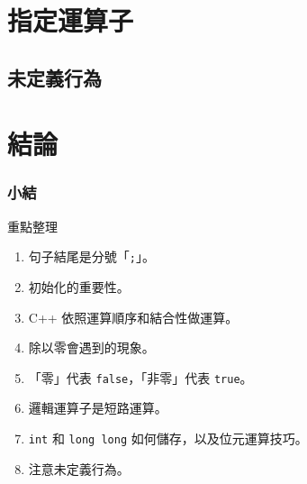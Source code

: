 \documentclass[utf8]{beamer}
\begin{document}
\begin{CJK}{UTF8}{bkai}
\section{指定運算子}

\subsection{未定義行為}

\section{結論}

\begin{frame}[fragile]
  \frametitle{小結}
  \begin{alertblock}{重點整理}
    \begin{enumerate}[<+->]
    \item 句子結尾是分號「\lstinline{;}」。
    \item 初始化的重要性。
    \item C++ 依照運算順序和結合性做運算。
    \item 除以零會遇到的現象。
    \item 「零」代表 \lstinline{false}，「非零」代表 \lstinline{true}。
    \item 邏輯運算子是短路運算。
    \item \lstinline{int} 和 \lstinline{long long} 如何儲存，以及位元運算技巧。
    \item 注意未定義行為。
    \end{enumerate}
  \end{alertblock}
\end{frame}

\clearpage
\end{CJK}
\end{document}
